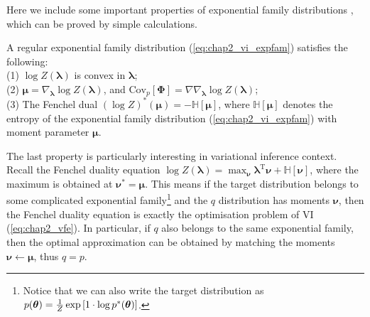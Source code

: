 Here we include some important properties of exponential family distributions \citep{wainwright:graphical2008}, which can be proved by simple calculations.
\begin{prop}
\label{prop:chap2_expfam}
A regular exponential family distribution (\ref{eq:chap2_vi_expfam}) satisfies the following: \\
(1) $\log Z(\bm{\lambda})$ is convex in $\bm{\lambda}$; \\
(2) $\bm{\mu} = \nabla_{\bm{\lambda}} \log Z(\bm{\lambda})$, and $\text{Cov}_{p}[\bm{\Phi}] = \nabla \nabla_{\bm{\lambda}} \log Z(\bm{\lambda})$; \\
(3) The Fenchel dual $(\log Z)^*(\bm{\mu}) = -\mathbb{H}[\bm{\mu}]$, where $\mathbb{H}[\bm{\mu}]$ denotes the entropy of the exponential family distribution (\ref{eq:chap2_vi_expfam}) with moment parameter $\bm{\mu}$.
\label{prop:chap2_vi_expfam}
\end{prop}
%
The last property is particularly interesting in variational inference context. Recall the Fenchel duality equation $\log Z(\bm{\lambda}) = \max_{\bm{\nu}} \bm{\lambda}^{\text{T}} \bm{\nu} + \mathbb{H}[\bm{\nu}]$, where the maximum is obtained at $\bm{\nu}^* = \bm{\mu}$. This means if the target distribution belongs to some complicated exponential family\footnote{Notice that we can also write the target distribution as $p(\bm{\theta}) = \frac{1}{Z} \exp \left[ 1 \cdot \log p^*(\bm{\theta}) \right]$. } and the $q$ distribution has moments $\bm{\nu}$, then the Fenchel duality equation is exactly the optimisation problem of VI (\ref{eq:chap2_vfe}). In particular, if $q$ also belongs to the same exponential family, then the optimal approximation can be obtained by matching the moments $\bm{\nu} \leftarrow \bm{\mu}$, thus $q = p$. 
